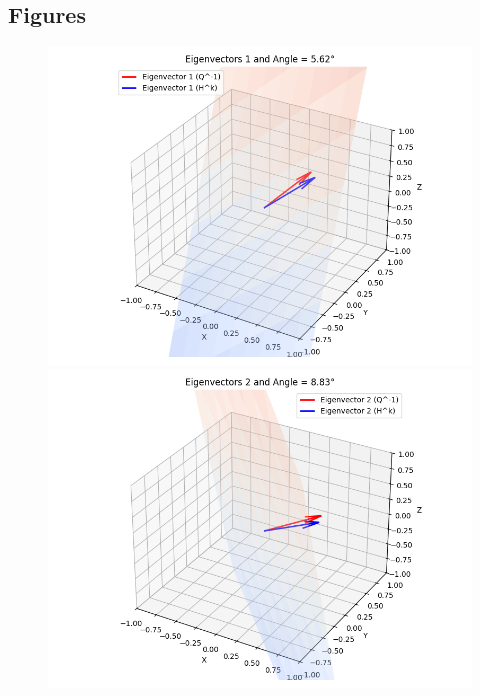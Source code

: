 \documentclass{article}
\begin{document}
\subsection{Figures}
\begin{figure}[H]
    \centering
    \includegraphics[width=1\textwidth]{eigenvector_pair_1.png}
    \includegraphics[width=1\textwidth]{eigenvector_pair_2.png}
    

\end{figure}
\end{document}
